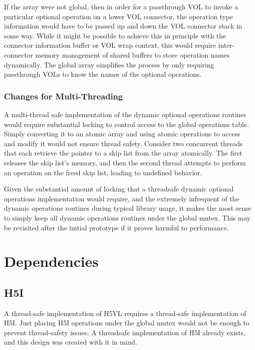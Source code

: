 \documentclass{article}
\begin{document}
If the array were not global, then in order for a passthrough VOL to invoke a particular optional operation on a lower VOL connector, the operation type information would have to be passed up and down the VOL connector stack in some way. While it might be possible to achieve this in principle with the connector information buffer or VOL wrap context, this would require inter-connector memory management of shared buffers to store operation names dynamically. The global array simplifies the process by only requiring passthrough VOLs to know the names of the optional operations.



\subsubsection{Changes for Multi-Threading}

A multi-thread safe implementation of the dynamic optional operations routines would require substantial locking to control access to the global operations table. Simply converting it to an atomic array and using atomic operations to access and modify it would not ensure thread safety. Consider two concurrent threads that each retrieve the pointer to a skip list from the array atomically. The first releases the skip list's memory, and then the second thread attempts to perform an operation on the freed skip list, leading to undefined behavior.

Given the substantial amount of locking that a threadsafe dynamic optional operations implementation would require, and the extremely infrequent of the dynamic operations routines during typical library usage, it makes the most sense to simply keep all dynamic operations routines under the global mutex. This may be revisited after the initial prototype if it proves harmful to performance.

\section{Dependencies}
\label{sec:dependencies}

\subsection{H5I}

A thread-safe implementation of H5VL requires a thread-safe implementation of H5I. Just placing H5I operations under the global mutex would not be enough to prevent thread-safety issues. A threadsafe implementation of H5I already exists, and this design was created with it in mind.
\end{document}
